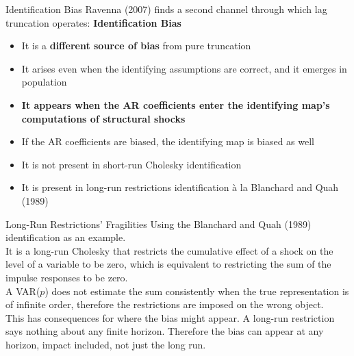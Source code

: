 \documentclass[11pt]{beamer}
\begin{document}
\begin{frame}{Identification Bias}\label{slide:identification_bias}
    Ravenna (2007) finds a second channel through which lag truncation operates: \textbf{\textcolor{PadovaRed}{Identification Bias}}
    \begin{itemize}
        \item It is a \textbf{different source of bias} from pure truncation
        \item It arises even when the identifying assumptions are correct, and it emerges in population
        \item \textbf{It appears when the AR coefficients enter the identifying map's computations of structural shocks}
        \item If the AR coefficients are biased, the identifying map is biased as well
        \vspace{0.3cm}
        
        \item It is not present in short-run Cholesky identification
        \item It is present in long-run restrictions identification à la Blanchard and Quah (1989)
    \end{itemize}
    
    \begin{center}
        \hyperlink{slide:truncation_bias}{}
    \end{center}

\end{frame}

\begin{frame}{Long-Run Restrictions' Fragilities}
    Using the Blanchard and Quah (1989) identification as an example.
    \\
    It is a long-run Cholesky that restricts the cumulative effect of a shock on the level of a variable to be zero, which is equivalent to restricting the sum of the impulse responses to be zero.
    \vspace{0.3cm}
    \\
    A VAR($p$) does not estimate the sum consistently when the true representation is of infinite order,
    therefore the restrictions are imposed on the wrong object.
    \vspace{0.3cm}
    \\
    This has consequences for where the bias might appear. A long-run restriction says nothing 
    about any finite horizon. Therefore the bias can appear at any horizon, impact included, not just the long run.

    \begin{center}
        \hyperlink{slide:truncation_bias}{}
    \end{center}

\end{frame}
\end{document}
